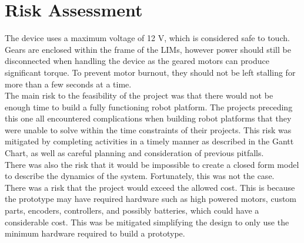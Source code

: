 \chapter{Risk Assessment}

The device uses a maximum voltage of 12 V, which is considered safe to touch. Gears are enclosed within the frame of the LIMs, however power should still be disconnected when handling the device as the geared motors can produce significant torque. To prevent motor burnout, they should not be left stalling for more than a few seconds at a time.\\

\noindent The main risk to the feasibility of the project was that there would not be enough time to build a fully functioning robot platform. The projects preceding this one all encountered complications when building robot platforms that they were unable to solve within the time constraints of their projects. This risk was mitigated by completing activities in a timely manner as described in the Gantt Chart, as well as careful planning and consideration of previous pitfalls.
\\

\noindent There was also the risk that it would be impossible to create a closed form model to describe the dynamics of the system. Fortunately, this was not the case.\\

\noindent There was a risk that the project would exceed the allowed cost. This is because the prototype may have required hardware such as high powered motors, custom parts, encoders, controllers, and possibly batteries, which could have a considerable cost. This was be mitigated simplifying the design to only use the minimum hardware required to build a prototype.\\

